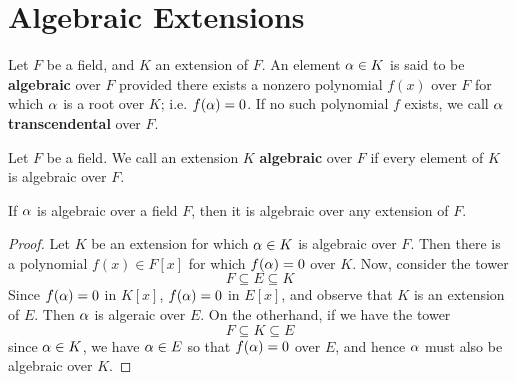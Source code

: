 \section{Algebraic Extensions}
\label{section_8.2}

\begin{definition}
  Let $F$ be a field, and $K$ an extension of $F$. An element $\alpha \in K$
  is said to be \textbf{algebraic} over $F$ provided there exists a
  nonzero polynomial $f(x)$ over $F$ for which $\alpha$ is a root over
  $K$; i.e. $f(\alpha)=0$. If no such polynomial $f$ exists, we call $\alpha$
  \textbf{transcendental} over $F$.
\end{definition}

\begin{definition}
  Let $F$ be a field. We call an extension $K$ \textbf{algebraic} over
  $F$ if every element of $K$ is algebraic over $F$.
\end{definition}

\begin{proposition}\label{proposition_8.2.1}
  If $\alpha$ is algebraic over a field $F$, then it is algebraic over any
  extension of $F$.
\end{proposition}
\begin{proof}
  Let $K$ be an extension for which $\alpha \in K$ is algebraic over $F$.
  Then there is a polynomial $f(x) \in F[x]$ for which $f(\alpha)=0$ over
  $K$. Now, consider the tower
  \begin{equation*}
    F \subseteq E \subseteq K
  \end{equation*}
  Since $f(\alpha)=0$ in $K[x]$, $f(\alpha)=0$ in $E[x]$, and observe that $K$
  is an extension of $E$. Then $\alpha$ is algeraic over $E$. On the
  otherhand, if we have the tower
  \begin{equation*}
    F \subseteq K \subseteq E
  \end{equation*}
  since $\alpha \in K$, we have $\alpha \in E$ so that $f(\alpha)=0$ over $E$, and
  hence $\alpha$ must also be algebraic over $K$.
\end{proof}


